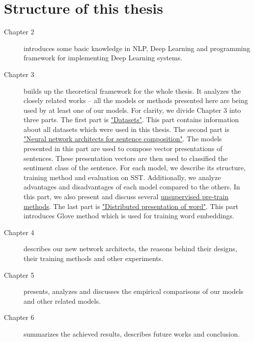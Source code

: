\section{Structure of this thesis}
\begin{description}
\item [Chapter 2] introduces some basic knowledge in NLP, Deep Learning and programming framework for implementing Deep Learning systems. 
\item [Chapter 3] builds up the theoretical framework for the whole thesis. 
It analyzes the closely related works -- all the models or methods presented here are being used by at least one of our models.
For clarity, we divide Chapter 3 into three parts.
The first part is \hyperref[sec:dataset]{"Datasets"}. 
This part contains information about all datasets which were used in this thesis.
The second part is \hyperref[sec:composer]{"Neural network architects for sentence composition"}.
The models presented in this part are used to compose vector presentations of sentences.
These presentation vectors are then used to classified the sentiment class of the sentence.
For each model, we describe its structure, training method and evaluation on SST.
Additionally, we analyze advantages and disadvantages of each model compared to the others.
In this part, we also present and discuss several \hyperref[sec:unsupervised-pretrain]{unsupervised pre-train methods}.
The last part is \hyperref[sec:distributed-word]{"Distributed presentation of word"}. 
This part introduces Glove method which is used for training word embeddings.
\item [Chapter 4] describes our new network architects, the reasons behind their designs, their training methods and other experiments. 
\item [Chapter 5] presents, analyzes and discusses the empirical comparisons of our models and other related models.
\item [Chapter 6] summarizes the achieved results, describes future works and conclusion.
\end{description}